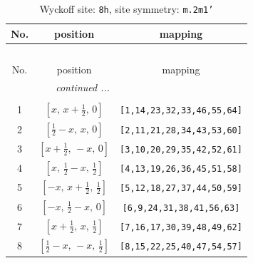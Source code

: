 \documentclass[fleqn,8pt]{jsarticle}
\begin{document}
\begin{longtable}{ccc}
\caption{Wyckoff site: {\tt 8h}, site symmetry: {\tt m.2m1'}}
 \\
 \hline \hline
No. & position & mapping \\ \hline \endfirsthead

\multicolumn{2}{l}{\tablename\ \thetable{}} \\
 \hline \hline
No. & position & mapping \\ \hline \endhead

 \hline \hline
\multicolumn{2}{r}{\footnotesize\it continued ...} \\ \endfoot

 \hline \hline
\multicolumn{2}{r}{} \\ \endlastfoot

1 & $\left[ x,\, x + \frac{1}{2},\, 0 \right]$ & {\tt [1,14,23,32,33,46,55,64]} \\ \hline
2 & $\left[ \frac{1}{2} - x,\, x,\, 0 \right]$ & {\tt [2,11,21,28,34,43,53,60]} \\ \hline
3 & $\left[ x + \frac{1}{2},\, - x,\, 0 \right]$ & {\tt [3,10,20,29,35,42,52,61]} \\ \hline
4 & $\left[ x,\, \frac{1}{2} - x,\, \frac{1}{2} \right]$ & {\tt [4,13,19,26,36,45,51,58]} \\ \hline
5 & $\left[ - x,\, x + \frac{1}{2},\, \frac{1}{2} \right]$ & {\tt [5,12,18,27,37,44,50,59]} \\ \hline
6 & $\left[ - x,\, \frac{1}{2} - x,\, 0 \right]$ & {\tt [6,9,24,31,38,41,56,63]} \\ \hline
7 & $\left[ x + \frac{1}{2},\, x,\, \frac{1}{2} \right]$ & {\tt [7,16,17,30,39,48,49,62]} \\ \hline
8 & $\left[ \frac{1}{2} - x,\, - x,\, \frac{1}{2} \right]$ & {\tt [8,15,22,25,40,47,54,57]} \\
\end{longtable}
\renewcommand{\arraystretch}{1.2}
\end{document}
